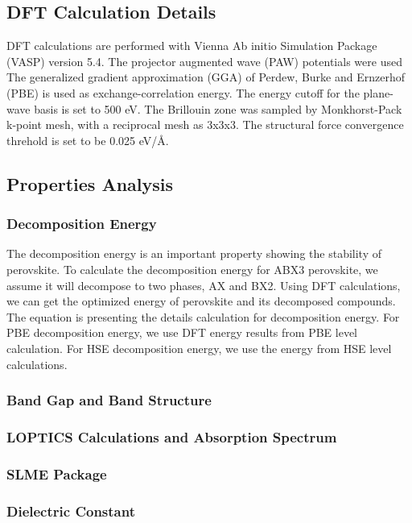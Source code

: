 \documentclass[twoside,twocolumn,9pt]{article}
\begin{document}
\subsection*{DFT Calculation Details}
DFT calculations are performed with Vienna Ab initio Simulation Package (VASP) version 5.4. The projector augmented wave (PAW) potentials were used The generalized gradient approximation (GGA) of Perdew, Burke and Ernzerhof (PBE) is used as exchange-correlation energy. The energy cutoff for the plane-wave basis is set to 500 eV. The Brillouin zone was sampled by Monkhorst-Pack k-point mesh, with a reciprocal mesh as 3x3x3. The structural force convergence threhold is set to be 0.025 eV/Å.

\subsection*{Properties Analysis}
\subsubsection*{Decomposition Energy}
The decomposition energy is an important property showing the stability of perovskite. To calculate the decomposition energy for ABX3 perovskite, we assume it will decompose to two phases, AX and BX2. Using DFT calculations, we can get the optimized energy of perovskite and its decomposed compounds.
The equation is presenting the details calculation for decomposition energy. For PBE decomposition energy, we use DFT energy results from PBE level calculation. For HSE decomposition energy, we use the energy from HSE level calculations.
\subsubsection{Band Gap and Band Structure}

\subsubsection{LOPTICS Calculations and Absorption Spectrum}

\subsubsection{SLME Package}

\subsubsection{Dielectric Constant }
\end{document}
